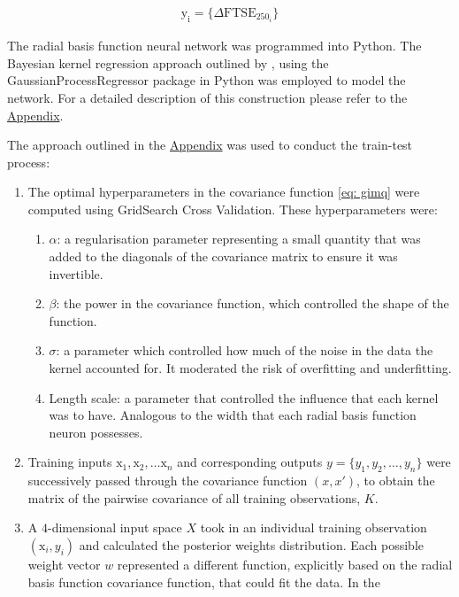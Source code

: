 \documentclass[11pt,a4paper]{article}
\newcommand{\citeboth}[1]{\citeauthor{#1} \citep{#1}}
\begin{document}
\begin{align}
    \boldsymbol{\mathrm{y_i}} = \{\Delta \text{FTSE}_{250_i}\}
\end{align}

The radial basis function neural network was programmed into Python. The Bayesian kernel regression approach outlined by 
\citeboth{bishop1995}, using the GaussianProcessRegressor package in Python was employed to model the network. For a 
detailed description of this construction please refer to the \hyperref[sec: appendix]{Appendix}.

The approach outlined in the \hyperref[sec: appendix]{Appendix} was used to conduct the train-test process:
\begin{enumerate}
    \item The optimal hyperparameters in the covariance function \eqref{eq: gimq} 
    were computed using GridSearch Cross Validation. These hyperparameters were:
    \begin{enumerate}
        \item $\alpha$: a regularisation parameter representing a small quantity
        that was added to the diagonals of the covariance matrix to ensure it was 
        invertible. 
        \item $\beta$: the power in the covariance function, which controlled the shape of the function.
        \item $\sigma$: a parameter which controlled how much of the noise in the data the kernel accounted for. It moderated the risk of overfitting and underfitting.
        \item Length scale: a parameter that controlled the influence that each kernel was to have. Analogous to 
        the width that each radial basis function neuron possesses.
    \end{enumerate}
    \item Training inputs $\boldsymbol{\mathrm{x}}_1, \boldsymbol{\mathrm{x}}_2,\ldots \boldsymbol{\mathrm{x}}_{n}$
    and corresponding outputs \( y = \{y_1, y_2, \dots, y_n\} \) were successively passed through the 
    covariance function $(x,x')$, to obtain the matrix of the pairwise covariance of 
    all training observations, $K$.
    \item A $4$-dimensional input space $X$ took in an individual training observation $(\boldsymbol{\mathrm{x}}_{i}, y_i)$ and 
    calculated the posterior weights distribution. 
    Each possible weight vector $w$ represented a different function, explicitly 
    based on the radial basis function covariance function, that could fit the data. In the 

\end{enumerate}
\end{document}
